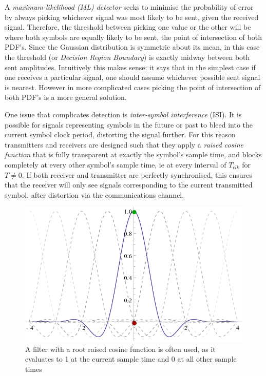 A \emph{maximum-likelihood (ML) detector} seeks to minimise the probability of
error by always picking whichever signal was most likely to be sent, given
the received signal. Therefore, the threshold between picking one value or the other
will be where both symbols are equally likely to be sent, the point of
intersection of both PDF's. Since the Gaussian distribution is symmetric
about its mean, in this case the threshold (or \emph{Decision Region
Boundary}) is exactly midway between both sent amplitudes. Intuitively
this makes sense: it says that in the simplest case if one receives a particular
signal, one should assume whichever possible sent signal is nearest. However in more complicated cases picking the point of intersection of both PDF's
is a more general solution. 

One issue that complicates detection is \emph{inter-symbol
interference} (ISI). It is possible for signals representing symbols in
the future or past to bleed into the current symbol clock period,
distorting the signal further. For this reason transmitters and receivers
are designed such that they apply a \emph{raised cosine function} that
is fully transparent at exactly the symbol's sample time, and blocks
completely at every other symbol's sample time, ie at every interval of
$T_{clk}$ for $T \neq 0$. If both receiver and transmitter are perfectly
synchronised, this ensures that the receiver will only see signals
corresponding to the current transmitted symbol, after distortion via
the communications channel.

\begin{figure}[htbp]
\centering
\includegraphics[width=\linewidth]{rrc_sync.png}
\caption{A filter with a root raised cosine function is often used, as
it evaluates to 1 at the current sample time and 0 at all other sample
times}
\end{figure}

